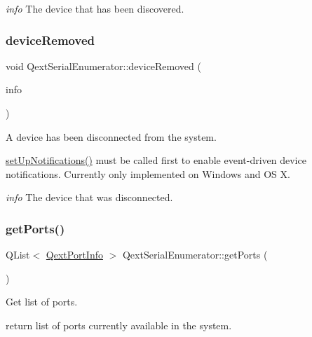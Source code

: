 {\itshape info} The device that has been discovered. \mbox{\label{classQextSerialEnumerator_a44e8a909d4bbbb759a79630e01a4f249}} 
\subsubsection{\texorpdfstring{device\+Removed}{deviceRemoved}}
{\footnotesize\ttfamily void Qext\+Serial\+Enumerator\+::device\+Removed (\begin{DoxyParamCaption}\item[{const \hyperlink{structQextPortInfo}{Qext\+Port\+Info} \&}]{info }\end{DoxyParamCaption})\hspace{0.3cm}{\ttfamily [signal]}}

A device has been disconnected from the system.

\hyperlink{classQextSerialEnumerator_a5a8caf21f4ad519323f13219651274ec}{set\+Up\+Notifications()} must be called first to enable event-\/driven device notifications. Currently only implemented on Windows and OS X.

{\itshape info} The device that was disconnected. \mbox{\label{classQextSerialEnumerator_a7b0e5f76259ae0651ea23763decc2642}} 
\subsubsection{\texorpdfstring{get\+Ports()}{getPorts()}}
{\footnotesize\ttfamily Q\+List$<$ \hyperlink{structQextPortInfo}{Qext\+Port\+Info} $>$ Qext\+Serial\+Enumerator\+::get\+Ports (\begin{DoxyParamCaption}{ }\end{DoxyParamCaption})\hspace{0.3cm}{\ttfamily [static]}}

Get list of ports.

return list of ports currently available in the system. \mbox{\label{classQextSerialEnumerator_a5a8caf21f4ad519323f13219651274ec}} 
